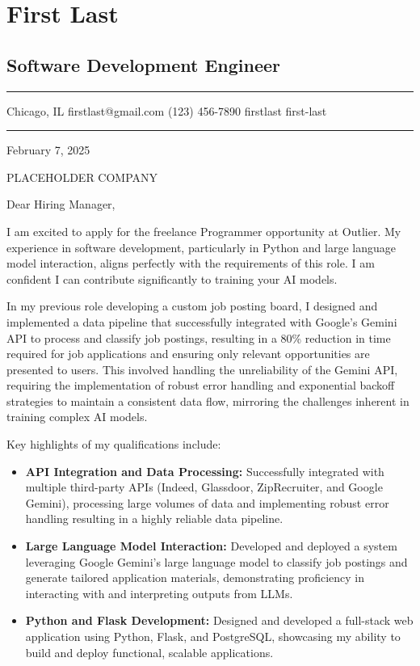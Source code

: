 \section{First Last}\label{first-last}

\subsection{Software Development
Engineer}\label{software-development-engineer}

\noindent\rule{\linewidth}{0.5pt}

\justifying

 Chicago, IL \faEnvelope{} firstlast@gmail.com
\faPhone{} (123) 456-7890  firstlast 
first-last

\noindent\rule{\linewidth}{0.5pt}

February 7, 2025

PLACEHOLDER COMPANY

Dear Hiring Manager,

I am excited to apply for the freelance Programmer opportunity at
Outlier. My experience in software development, particularly in Python
and large language model interaction, aligns perfectly with the
requirements of this role. I am confident I can contribute significantly
to training your AI models.

In my previous role developing a custom job posting board, I designed
and implemented a data pipeline that successfully integrated with
Google's Gemini API to process and classify job postings, resulting in a
80\% reduction in time required for job applications and ensuring only
relevant opportunities are presented to users. This involved handling
the unreliability of the Gemini API, requiring the implementation of
robust error handling and exponential backoff strategies to maintain a
consistent data flow, mirroring the challenges inherent in training
complex AI models.

Key highlights of my qualifications include:

\begin{itemize}
\tightlist
\item
  \textbf{API Integration and Data Processing:} Successfully integrated
  with multiple third-party APIs (Indeed, Glassdoor, ZipRecruiter, and
  Google Gemini), processing large volumes of data and implementing
  robust error handling resulting in a highly reliable data pipeline.
\item
  \textbf{Large Language Model Interaction:} Developed and deployed a
  system leveraging Google Gemini's large language model to classify job
  postings and generate tailored application materials, demonstrating
  proficiency in interacting with and interpreting outputs from LLMs.
\item
  \textbf{Python and Flask Development:} Designed and developed a
  full-stack web application using Python, Flask, and PostgreSQL,
  showcasing my ability to build and deploy functional, scalable
  applications.
\end{itemize}

